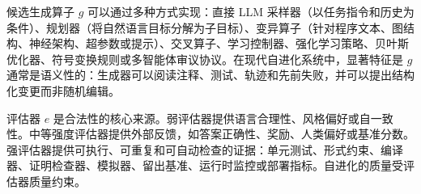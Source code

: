 候选生成算子 $g$ 可以通过多种方式实现：直接 LLM 采样器（以任务指令和历史为条件）、规划器（将自然语言目标分解为子目标）、变异算子（针对程序文本、图结构、神经架构、超参数或提示）、交叉算子、学习控制器、强化学习策略、贝叶斯优化器、符号变换规则或多智能体审议协议。在现代自进化系统中，显著特征是 $g$ 通常是语义性的：生成器可以阅读注释、测试、轨迹和先前失败，并可以提出结构化变更而非随机编辑。

评估器 $e$ 是合法性的核心来源。弱评估器提供语言合理性、风格偏好或自一致性。中等强度评估器提供外部反馈，如答案正确性、奖励、人类偏好或基准分数。强评估器提供可执行、可重复和可自动检查的证据：单元测试、形式约束、编译器、证明检查器、模拟器、留出基准、运行时监控或部署指标。自进化的质量受评估器质量约束。

